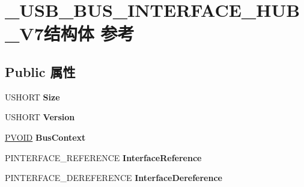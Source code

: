 \hypertarget{struct___u_s_b___b_u_s___i_n_t_e_r_f_a_c_e___h_u_b___v7}{}\section{\+\_\+\+U\+S\+B\+\_\+\+B\+U\+S\+\_\+\+I\+N\+T\+E\+R\+F\+A\+C\+E\+\_\+\+H\+U\+B\+\_\+\+V7结构体 参考}
\label{struct___u_s_b___b_u_s___i_n_t_e_r_f_a_c_e___h_u_b___v7}
\subsection*{Public 属性}
\begin{DoxyCompactItemize}
\item 
\mbox{\label{struct___u_s_b___b_u_s___i_n_t_e_r_f_a_c_e___h_u_b___v7_a638ed3d349677f4c3b1f2efef5c14dfd}} 
U\+S\+H\+O\+RT {\bfseries Size}
\item 
\mbox{\label{struct___u_s_b___b_u_s___i_n_t_e_r_f_a_c_e___h_u_b___v7_adf998e43302a42e71f6b098d8bf5601a}} 
U\+S\+H\+O\+RT {\bfseries Version}
\item 
\mbox{\label{struct___u_s_b___b_u_s___i_n_t_e_r_f_a_c_e___h_u_b___v7_a6c3ee9ba8234dc5d24229cf2cd87f62a}} 
\hyperlink{interfacevoid}{P\+V\+O\+ID} {\bfseries Bus\+Context}
\item 
\mbox{\label{struct___u_s_b___b_u_s___i_n_t_e_r_f_a_c_e___h_u_b___v7_a3e636fb57b7db69e14bdab4f68105722}} 
P\+I\+N\+T\+E\+R\+F\+A\+C\+E\+\_\+\+R\+E\+F\+E\+R\+E\+N\+CE {\bfseries Interface\+Reference}
\item 
\mbox{\label{struct___u_s_b___b_u_s___i_n_t_e_r_f_a_c_e___h_u_b___v7_a6e62e444aec7045b08da6078ed90844a}} 
P\+I\+N\+T\+E\+R\+F\+A\+C\+E\+\_\+\+D\+E\+R\+E\+F\+E\+R\+E\+N\+CE {\bfseries Interface\+Dereference}
\item 
\mbox{\label{struct___u_s_b___b_u_s___i_n_t_e_r_f_a_c_e___h_u_b___v7_afa4019a6ff0ad221f402789db8bd14bf}} 

\end{DoxyCompactItemize}
